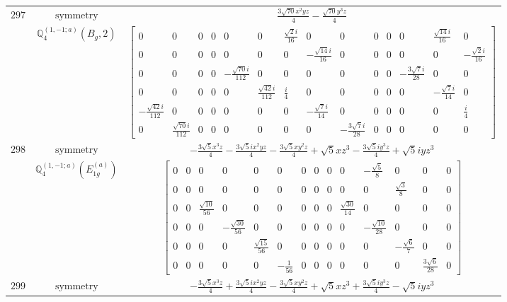\documentclass[fleqn,8pt,landscape]{jsarticle}
\begin{document}
\begin{longtable}{ccc}
$ 297 $ & $ \text{symmetry} $ & $ \frac{3 \sqrt{70} x^{2} y z}{4} - \frac{\sqrt{70} y^{3} z}{4} $ \\
$  $ & $ \mathbb{Q}_{4}^{(1,-1;a)}(B_{g},2) $ & $ \begin{bmatrix} 0 & 0 & 0 & 0 & 0 & 0 & \frac{\sqrt{2} i}{16} & 0 & 0 & 0 & 0 & 0 & \frac{\sqrt{14} i}{16} & 0 \\ 0 & 0 & 0 & 0 & 0 & 0 & 0 & - \frac{\sqrt{14} i}{16} & 0 & 0 & 0 & 0 & 0 & - \frac{\sqrt{2} i}{16} \\ 0 & 0 & 0 & 0 & - \frac{\sqrt{70} i}{112} & 0 & 0 & 0 & 0 & 0 & 0 & - \frac{3 \sqrt{7} i}{28} & 0 & 0 \\ 0 & 0 & 0 & 0 & 0 & \frac{\sqrt{42} i}{112} & \frac{i}{4} & 0 & 0 & 0 & 0 & 0 & - \frac{\sqrt{7} i}{14} & 0 \\ - \frac{\sqrt{42} i}{112} & 0 & 0 & 0 & 0 & 0 & 0 & - \frac{\sqrt{7} i}{14} & 0 & 0 & 0 & 0 & 0 & \frac{i}{4} \\ 0 & \frac{\sqrt{70} i}{112} & 0 & 0 & 0 & 0 & 0 & 0 & - \frac{3 \sqrt{7} i}{28} & 0 & 0 & 0 & 0 & 0 \end{bmatrix} $ \\ \hline
$ 298 $ & $ \text{symmetry} $ & $ - \frac{3 \sqrt{5} x^{3} z}{4} - \frac{3 \sqrt{5} i x^{2} y z}{4} - \frac{3 \sqrt{5} x y^{2} z}{4} + \sqrt{5} x z^{3} - \frac{3 \sqrt{5} i y^{3} z}{4} + \sqrt{5} i y z^{3} $ \\
$  $ & $ \mathbb{Q}_{4}^{(1,-1;a)}(E_{1g}^{(a)}) $ & $ \begin{bmatrix} 0 & 0 & 0 & 0 & 0 & 0 & 0 & 0 & 0 & 0 & - \frac{\sqrt{5}}{8} & 0 & 0 & 0 \\ 0 & 0 & 0 & 0 & 0 & 0 & 0 & 0 & 0 & 0 & 0 & \frac{\sqrt{3}}{8} & 0 & 0 \\ 0 & 0 & \frac{\sqrt{10}}{56} & 0 & 0 & 0 & 0 & 0 & 0 & \frac{\sqrt{30}}{14} & 0 & 0 & 0 & 0 \\ 0 & 0 & 0 & - \frac{\sqrt{30}}{56} & 0 & 0 & 0 & 0 & 0 & 0 & - \frac{\sqrt{10}}{28} & 0 & 0 & 0 \\ 0 & 0 & 0 & 0 & \frac{\sqrt{15}}{56} & 0 & 0 & 0 & 0 & 0 & 0 & - \frac{\sqrt{6}}{7} & 0 & 0 \\ 0 & 0 & 0 & 0 & 0 & - \frac{1}{56} & 0 & 0 & 0 & 0 & 0 & 0 & \frac{3 \sqrt{6}}{28} & 0 \end{bmatrix} $ \\ \hline
$ 299 $ & $ \text{symmetry} $ & $ - \frac{3 \sqrt{5} x^{3} z}{4} + \frac{3 \sqrt{5} i x^{2} y z}{4} - \frac{3 \sqrt{5} x y^{2} z}{4} + \sqrt{5} x z^{3} + \frac{3 \sqrt{5} i y^{3} z}{4} - \sqrt{5} i y z^{3} $ \\

\end{longtable}
\end{document}
